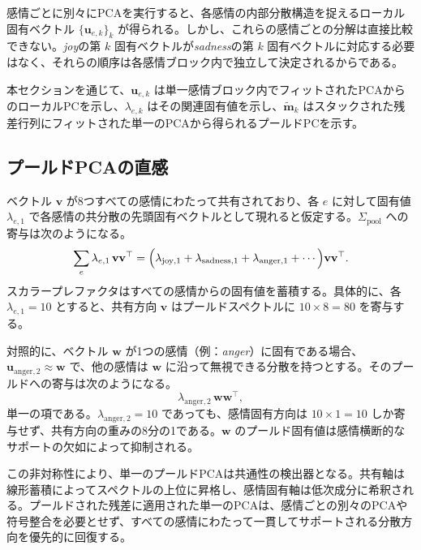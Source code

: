 感情ごとに別々にPCAを実行すると、各感情の内部分散構造を捉えるローカル固有ベクトル $\{\mathbf{u}_{e,k}\}_{k}$ が得られる。しかし、これらの感情ごとの分解は直接比較できない。\textit{joy}の第 $k$ 固有ベクトルが\textit{sadness}の第 $k$ 固有ベクトルに対応する必要はなく、それらの順序は各感情ブロック内で独立して決定されるからである。\par

本セクションを通じて、$\mathbf{u}_{e,k}$ は単一感情ブロック内でフィットされたPCAからのローカルPCを示し、$\lambda_{e,k}$ はその関連固有値を示し、$\tilde{\mathbf{m}}_k$ はスタックされた残差行列にフィットされた単一のPCAから得られるプールドPCを示す。\par

\subsection{プールドPCAの直感}

ベクトル $\mathbf{v}$ が8つすべての感情にわたって共有されており、各 $e$ に対して固有値 $\lambda_{e,1}$ で各感情の共分散の先頭固有ベクトルとして現れると仮定する。$\Sigma_{\mathrm{pool}}$ への寄与は次のようになる。
\[
\sum_{e} \lambda_{e,1}\,\mathbf{v}\mathbf{v}^\top
= \Bigl(\lambda_{\mathrm{joy},1} + \lambda_{\mathrm{sadness},1} + \lambda_{\mathrm{anger},1} + \cdots\Bigr)\mathbf{v}\mathbf{v}^\top.
\]
スカラープレファクタはすべての感情からの固有値を蓄積する。具体的に、各 $\lambda_{e,1} = 10$ とすると、共有方向 $\mathbf{v}$ はプールドスペクトルに $10 \times 8 = 80$ を寄与する。\par

対照的に、ベクトル $\mathbf{w}$ が1つの感情（例：\textit{anger}）に固有である場合、$\mathbf{u}_{\mathrm{anger},2} \approx \mathbf{w}$ で、他の感情は $\mathbf{w}$ に沿って無視できる分散を持つとする。そのプールドへの寄与は次のようになる。
\[
\lambda_{\mathrm{anger},2}\,\mathbf{w}\mathbf{w}^\top,
\]
単一の項である。$\lambda_{\mathrm{anger},2} = 10$ であっても、感情固有方向は $10 \times 1 = 10$ しか寄与せず、共有方向の重みの8分の1である。$\mathbf{w}$ のプールド固有値は感情横断的なサポートの欠如によって抑制される。\par

この非対称性により、単一のプールドPCAは共通性の検出器となる。共有軸は線形蓄積によってスペクトルの上位に昇格し、感情固有軸は低次成分に希釈される。プールドされた残差に適用された単一のPCAは、感情ごとの別々のPCAや符号整合を必要とせず、すべての感情にわたって一貫してサポートされる分散方向を優先的に回復する。\par

